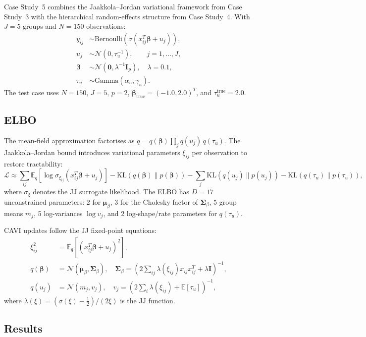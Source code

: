 \documentclass[11pt,a4paper]{article}
\newcommand{\E}{\mathbb{E}}
\newcommand{\N}{\mathcal{N}}
\begin{document}
Case Study~5 combines the Jaakkola--Jordan variational framework from Case Study~3
with the hierarchical random-effects structure from Case Study~4.
With $J=5$ groups and $N=150$ observations:
\begin{align}
  y_{ij} &\sim \mathrm{Bernoulli}\!\left(\sigma(x_{ij}^T\bm{\beta} + u_j)\right), \\
  u_j &\sim \N(0, \tau_u^{-1}), \qquad j = 1,\ldots,J, \\
  \bm{\beta} &\sim \N(\bm{0}, \lambda^{-1}\bm{I}_p), \quad \lambda = 0.1, \\
  \tau_u &\sim \mathrm{Gamma}(\alpha_u, \gamma_u).
\end{align}
The test case uses $N=150$, $J=5$, $p=2$, $\bm{\beta}_{\mathrm{true}}=(-1.0,2.0)^T$,
and $\tau_u^{\mathrm{true}}=2.0$.

\subsection{ELBO}

The mean-field approximation factorises as
$q = q(\bm{\beta})\prod_j q(u_j)\,q(\tau_u)$.
The Jaakkola--Jordan bound introduces variational parameters $\xi_{ij}$ per
observation to restore tractability:
\begin{equation}
  \mathcal{L} \approx \sum_{ij} \E_q[\log \sigma_{\xi_{ij}}(x_{ij}^T\bm{\beta}+u_j)]
    - \mathrm{KL}(q(\bm{\beta})\|p(\bm{\beta}))
    - \sum_j \mathrm{KL}(q(u_j)\|p(u_j))
    - \mathrm{KL}(q(\tau_u)\|p(\tau_u)),
\end{equation}
where $\sigma_\xi$ denotes the JJ surrogate likelihood.
The ELBO has $D=17$ unconstrained parameters: 2 for $\bm{\mu}_\beta$, 3 for the
Cholesky factor of $\bm{\Sigma}_\beta$, 5 group means $m_j$, 5 log-variances
$\log v_j$, and 2 log-shape/rate parameters for $q(\tau_u)$.

CAVI updates follow the JJ fixed-point equations:
\begin{align}
  \xi_{ij}^2 &= \E_q[(x_{ij}^T\bm{\beta}+u_j)^2], \\
  q(\bm{\beta}) &= \N(\bm{\mu}_\beta, \bm{\Sigma}_\beta), \quad
    \bm{\Sigma}_\beta = \left(2\sum_{ij}\lambda(\xi_{ij})x_{ij}x_{ij}^T + \lambda\bm{I}\right)^{-1}, \\
  q(u_j) &= \N(m_j, v_j), \quad
    v_j = \left(2\sum_i \lambda(\xi_{ij}) + \E[\tau_u]\right)^{-1},
\end{align}
where $\lambda(\xi) = (\sigma(\xi)-\tfrac{1}{2})/(2\xi)$ is the JJ function.

\subsection{Results}
\end{document}
